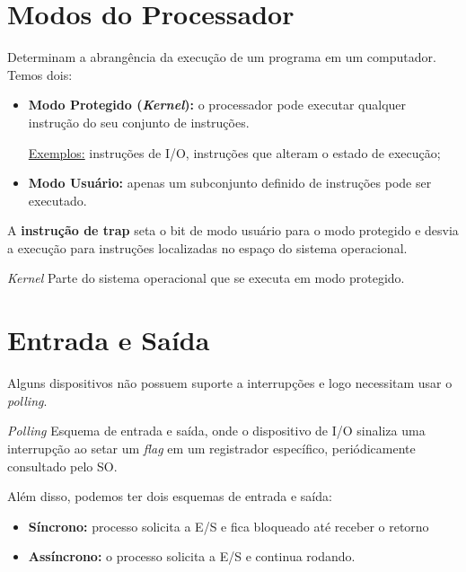\section{Modos do Processador}

Determinam a abrangência da execução de um programa em um computador. Temos dois:

\begin{itemize}
  \item \textbf{Modo Protegido (\textit{Kernel}):} o processador pode executar qualquer instrução do seu conjunto de instruções.

  \underline{Exemplos:} instruções de I/O, instruções que alteram o estado de execução; \\

  \item \textbf{Modo Usuário:} apenas um subconjunto definido de instruções pode ser executado.
\end{itemize}

A \textbf{instrução de trap} seta o bit de modo usuário para o modo protegido e desvia a execução para instruções localizadas no espaço do sistema operacional.

\begin{definicao}{\textit{Kernel}}
  Parte do sistema operacional que se executa em modo protegido.
\end{definicao}













\section{Entrada e Saída}
Alguns dispositivos não possuem suporte a interrupções e logo necessitam usar o \textit{polling}.

\begin{definicao}{\textit{Polling}}
  Esquema de entrada e saída, onde o dispositivo de I/O sinaliza uma interrupção ao setar um \textit{flag} em um registrador específico, periódicamente consultado pelo SO.
\end{definicao}


Além disso, podemos ter dois esquemas de entrada e saída:
\begin{itemize}
  \item \textbf{Síncrono:} processo solicita a E/S e fica bloqueado até receber o retorno

  \item \textbf{Assíncrono:} o processo solicita a E/S e continua rodando.
\end{itemize}


